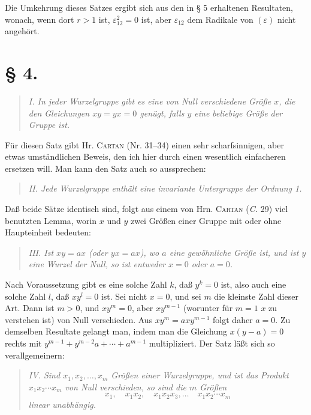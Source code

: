 \documentclass[11pt]{article}
\newcommand{\eps}{\varepsilon}
\begin{document}
Die Umkehrung dieses Satzes ergibt sich aus den in § 5 erhaltenen Resultaten, wonach, wenn dort $r>1$ ist, $\eps_{12}^2=0$ ist, aber $\eps_{12}$ dem Radikale von $(\eps)$ nicht angehört.

\section*{§ 4.}

\begin{quote}\itshape
I. In jeder Wurzelgruppe gibt es eine von Null verschiedene Größe $x$, die den Gleichungen $xy=yx=0$ genügt, falls $y$ eine beliebige Größe der Gruppe ist.
\end{quote}

Für diesen Satz gibt Hr. \textsc{Cartan} (Nr. 31--34) einen sehr scharfsinnigen, aber etwas umständlichen Beweis, den ich hier durch einen wesentlich einfacheren ersetzen will. Man kann den Satz auch so aussprechen:

\begin{quote}\itshape
II. Jede Wurzelgruppe enthält eine invariante Untergruppe der Ordnung 1.
\end{quote}

Daß beide Sätze identisch sind, folgt aus einem von Hrn. \textsc{Cartan} (\emph{C.} 29) viel benutzten Lemma, worin $x$ und $y$ zwei Größen einer Gruppe mit oder ohne Haupteinheit bedeuten:

\begin{quote}\itshape
III. Ist $xy=ax$ (oder $yx=ax$), wo $a$ eine gewöhnliche Größe ist, und ist $y$ eine Wurzel der Null, so ist entweder $x=0$ oder $a=0$.
\end{quote}

Nach Voraussetzung gibt es eine solche Zahl $k$, daß $y^k=0$ ist, also auch eine solche Zahl $l$, daß $xy^l=0$ ist. Sei nicht $x=0$, und sei $m$ die kleinste Zahl dieser Art. Dann ist $m>0$, und $xy^m=0$, aber $xy^{m-1}$ (worunter für $m=1$ $x$ zu verstehen ist) von Null verschieden. Aus $xy^m=axy^{m-1}$ folgt daher $a=0$. Zu demselben Resultate gelangt man, indem man die Gleichung $x(y-a)=0$ rechts mit $y^{m-1}+y^{m-2}a+\cdots+a^{m-1}$ multipliziert. Der Satz läßt sich so verallgemeinern:

\begin{quote}\itshape
IV. Sind $x_1,x_2,\ldots,x_m$ Größen einer Wurzelgruppe, und ist das Produkt $x_1x_2\cdots x_m$ von Null verschieden, so sind die $m$ Größen
\[
 x_1,
 \quad x_1x_2,
 \quad x_1x_2x_3,
 \ldots
 \quad x_1x_2\cdots x_m
\]
linear unabhängig.
\end{quote}
\end{document}
